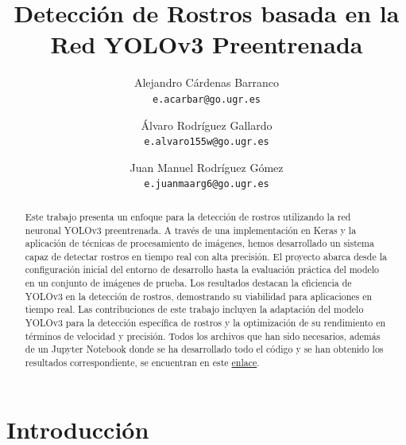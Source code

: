 \documentclass[10pt,twocolumn,letterpaper]{article}
\begin{document}
\title{Detección de Rostros basada en la Red YOLOv3 Preentrenada}

\author{Alejandro Cárdenas Barranco\\
{\tt\small e.acarbar@go.ugr.es}
\and
Álvaro Rodríguez Gallardo\\
{\tt\small e.alvaro155w@go.ugr.es}
\and
Juan Manuel Rodríguez Gómez\\
{\tt\small e.juanmaarg6@go.ugr.es}
}
\maketitle

\begin{abstract}

Este trabajo presenta un enfoque para la detección de rostros utilizando la red neuronal YOLOv3 preentrenada. A través de una implementación en Keras y la aplicación de técnicas de procesamiento de imágenes, 
hemos desarrollado un sistema capaz de detectar rostros en tiempo real con alta precisión. El proyecto abarca desde la configuración inicial del entorno de desarrollo hasta la evaluación práctica del modelo en un 
conjunto de imágenes de prueba. Los resultados destacan la eficiencia de YOLOv3 en la detección de rostros, demostrando su viabilidad para aplicaciones en tiempo real. Las contribuciones de este trabajo incluyen 
la adaptación del modelo YOLOv3 para la detección específica de rostros y la optimización de su rendimiento en términos de velocidad y precisión. Todos los archivos que han sido necesarios, además de un Jupyter Notebook
donde se ha desarrollado todo el código y se han obtenido los resultados correspondiente, se encuentran en este \href{https://drive.google.com/drive/folders/1dB7OtOwB2__0FQpF2SjowMTJx9Cuxit0?usp=drive_link} {enlace}.

   
\end{abstract}

\section{Introducción}
\label{sec:intro}
\end{document}
